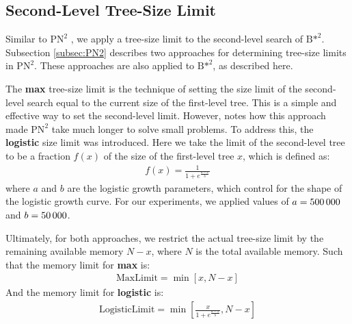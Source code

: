 \subsection{Second-Level Tree-Size Limit}
\label{subsec:Level2SizeLimit}
Similar to ${\text{PN}}^2$ \cite{Nagai2002}, we apply a tree-size limit to the second-level search of ${\text{B*}}^2$. Subsection \ref{subsec:PN2} describes two approaches for determining tree-size limits in ${\text{PN}}^2$. These approaches are also applied to ${\text{B*}}^2$, as described here.

The \textbf{max} tree-size limit is the technique of setting the size limit of the second-level search equal to the current size of the first-level tree. This is a simple and effective way to set the second-level limit. 
However,  notes how this approach made ${\text{PN}}^2$ take much longer to solve small problems. To address this, the \textbf{logistic} size limit was introduced. Here we take the limit of the second-level tree to be a fraction $f(x)$ of the size of the first-level tree $x$, which is defined as:\label{subsec:Level2SizeLimit:Sigmoid}
\begin{gather}
    f(x) = \frac{1}{1+e^{\frac{a-x}{b}}}
\end{gather}
where $a$ and $b$ are the logistic growth parameters, which control for the shape of the logistic growth curve. For our experiments, we applied values of $a=500\text{\,}000$ and $b=50\text{\,}000$.

\noindent Ultimately, for both approaches, we restrict the actual tree-size limit by the remaining available memory $N-x$, where $N$ is the total available memory. Such that the memory limit for \textbf{max} is:
\begin{gather}
    \text{MaxLimit} = \min\left[x,N-x\right]
\end{gather}
And the memory limit for \textbf{logistic} is:
\begin{gather}
    \text{LogisticLimit} = \min\left[\frac{x}{1+e^{\frac{a-x}{b}}}, N-x\right]
\end{gather}

